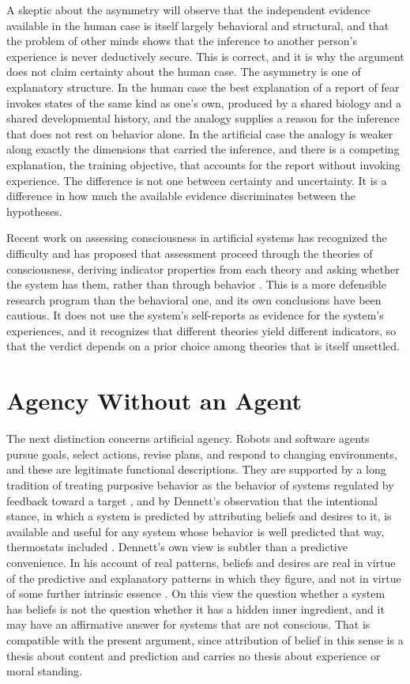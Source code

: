 \documentclass[12pt]{article}
\theoremstyle{definition}
\begin{document}
A skeptic about the asymmetry will observe that the independent evidence available in the human case is itself largely behavioral and structural, and that the problem of other minds shows that the inference to another person's experience is never deductively secure. This is correct, and it is why the argument does not claim certainty about the human case. The asymmetry is one of explanatory structure. In the human case the best explanation of a report of fear invokes states of the same kind as one's own, produced by a shared biology and a shared developmental history, and the analogy supplies a reason for the inference that does not rest on behavior alone. In the artificial case the analogy is weaker along exactly the dimensions that carried the inference, and there is a competing explanation, the training objective, that accounts for the report without invoking experience. The difference is not one between certainty and uncertainty. It is a difference in how much the available evidence discriminates between the hypotheses.

Recent work on assessing consciousness in artificial systems has recognized the difficulty and has proposed that assessment proceed through the theories of consciousness, deriving indicator properties from each theory and asking whether the system has them, rather than through behavior \cite{butlin2023}. This is a more defensible research program than the behavioral one, and its own conclusions have been cautious. It does not use the system's self-reports as evidence for the system's experiences, and it recognizes that different theories yield different indicators, so that the verdict depends on a prior choice among theories that is itself unsettled.

\section{Agency Without an Agent}
\label{sec:agency}

The next distinction concerns artificial agency. Robots and software agents pursue goals, select actions, revise plans, and respond to changing environments, and these are legitimate functional descriptions. They are supported by a long tradition of treating purposive behavior as the behavior of systems regulated by feedback toward a target \cite{rosenblueth1943}, and by Dennett's observation that the intentional stance, in which a system is predicted by attributing beliefs and desires to it, is available and useful for any system whose behavior is well predicted that way, thermostats included \cite{dennett1987}. Dennett's own view is subtler than a predictive convenience. In his account of real patterns, beliefs and desires are real in virtue of the predictive and explanatory patterns in which they figure, and not in virtue of some further intrinsic essence \cite{dennett1991real}. On this view the question whether a system has beliefs is not the question whether it has a hidden inner ingredient, and it may have an affirmative answer for systems that are not conscious. That is compatible with the present argument, since attribution of belief in this sense is a thesis about content and prediction and carries no thesis about experience or moral standing.
\end{document}

